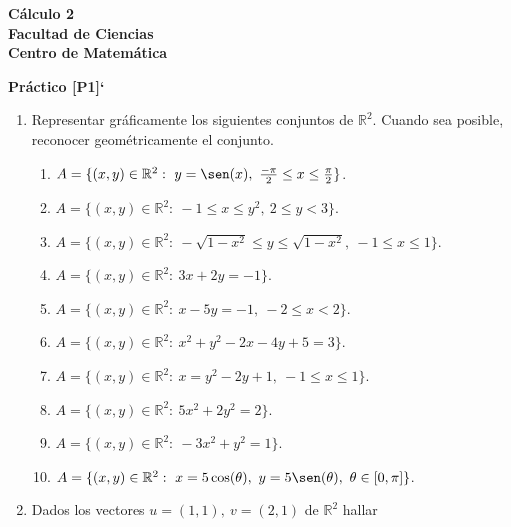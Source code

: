 \documentclass[11pt]{article}
\newcommand{\R}{\mathbb{R}}
\begin{document}
 \hfill {\bf C\'{a}lculo 2} \\
{\bf Facultad de Ciencias}  \\
{\bf Centro de Matem\'{a}tica} 

\vspace{1cm}

\begin{center}
{\bf Pr\'{a}ctico [P1]` }
\end{center}

\vspace{0,1cm}

\begin{enumerate}

\item Representar gr\'aficamente los siguientes conjuntos de $\R^2$. Cuando sea posible, reconocer geom\'etricamente el conjunto.

\begin{enumerate}

\item $A=\{(x,y)\in\R^2:\ y=\sen(x),\ \frac{-\pi}{2}\leq x \leq \frac{\pi}{2}\}$.

\item $A=\{(x,y)\in\R^2:\ -1\leq x \leq y^2,\ 2\leq y < 3\}$.

\item $A=\{(x,y)\in\R^2:\ -\sqrt{1-x^2}\leq y \leq \sqrt{1-x^2},\ -1\leq x \leq 1\}$.

\item $A=\{(x,y)\in\R^2:\ 3x+2y=-1\}$.

\item $A=\{(x,y)\in\R^2:\ x-5y=-1,\ -2\leq x < 2\}$.

\item $A=\{(x,y)\in\R^2:\ x^2+y^2-2x-4y+5=3\}$.

\item $A=\{(x,y)\in\R^2:\ x=y^2-2y+1,\ -1\leq x \leq 1\}$.

\item $A=\{(x,y)\in\R^2:\ 5x^2+2y^2=2\}$.

\item $A=\{(x,y)\in\R^2:\ -3x^2+y^2=1\}$.

\item $A=\{(x,y)\in\R^2:\ x=5\cos(\theta),\ y=5\sen(\theta),\ \theta\in[0,\pi]\}$.


\end{enumerate}


\item Dados los vectores $u=(1,1),\ v=(2,1)$ de $\R^2$ hallar


\end{enumerate}
\end{document}

